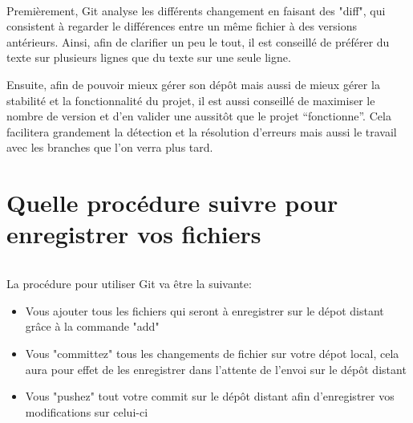 \documentclass[french, a4paper, 12pt, titlepage]{article}
\begin{document}
\paragraph{}Premièrement, Git analyse les différents changement en faisant des "diff", qui consistent à regarder le différences entre un même fichier à des versions antérieurs. Ainsi, afin de clarifier un peu le tout, il est conseillé de préférer du texte sur plusieurs lignes que du texte sur une seule ligne.

Ensuite, afin de pouvoir mieux gérer son dépôt mais aussi de mieux gérer la stabilité et la fonctionnalité du projet, il est aussi conseillé de maximiser le nombre de version et d'en valider une aussitôt que le projet ``fonctionne''. Cela facilitera grandement la détection et la résolution d'erreurs mais aussi le travail avec les branches que l'on verra plus tard.


\newpage
\part{Quelle procédure suivre pour enregistrer vos fichiers}
\paragraph{}La procédure pour utiliser Git va être la suivante:
\begin{itemize}
\item Vous ajouter tous les fichiers qui seront à enregistrer sur le dépot distant grâce à la commande "add"
\item Vous "committez" tous les changements de fichier sur votre dépot local, cela aura pour effet de les enregistrer dans l'attente de l'envoi sur le dépôt distant
\item Vous "pushez" tout votre commit sur le dépôt distant afin d'enregistrer vos modifications sur celui-ci
\end{itemize}
\end{document}

